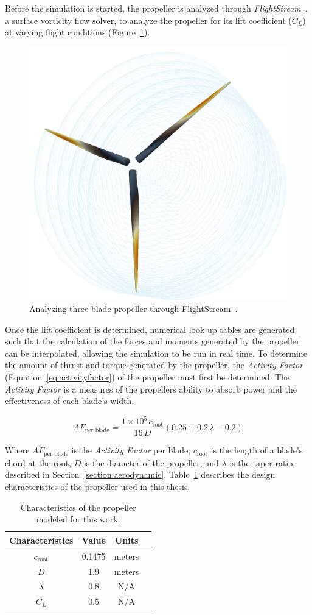 Before the simulation is started, the propeller is analyzed through \textit{FlightStream}~\cite{FlightStream}, a surface vorticity flow solver, to analyze the propeller for its lift coefficient (\(C_L\)) at varying flight conditions (Figure~\ref{fig:flightstreamprop}).

\begin{figure}[!ht]\label{fig:flightstreamprop}
    \centering
    \includegraphics[width=.35\linewidth]{Figures/flightstreamprop.png}
    \caption{Analyzing three-blade propeller through FlightStream~\cite{FlightStream}.}
\end{figure}

Once the lift coefficient is determined, numerical look up tables are generated such that the calculation of the forces and moments generated by the propeller can be interpolated, allowing the simulation to be run in real time. To determine the amount of thrust and torque generated by the propeller, the \textit{Activity Factor} (Equation~\ref{eq:activityfactor}) of the propeller must first be determined. The \textit{Activity Factor} is a measures of the propellers ability to absorb power and the effectiveness of each blade's width.

\begin{equation}\label{eq:activityfactor}
    AF_{\textrm{per blade}} = \frac{1 \times 10^5 \, c_{\textrm{root}}}{16 \, D} \left(0.25 + 0.2 \, \lambda - 0.2 \right)
\end{equation}

Where \(AF_{\textrm{per blade}}\) is the \textit{Activity Factor} per blade, \(c_{\textrm{root}}\) is the length of a blade's chord at the root, \(D\) is the diameter of the propeller, and \( \lambda \) is the taper ratio, described in Section~\ref{section:aerodynamic}. Table~\ref{tbl:propparams} describes the design characteristics of the propeller used in this thesis.

\begin{table}[!ht]\label{tbl:propparams}
    \caption{Characteristics of the propeller modeled for this work.}
    \centering
    \begin{tabular}{cccc}
        \toprule
        Characteristics       & Value  & Units  \\
        \midrule
        \(c_{\textrm{root}}\) & 0.1475 & meters \\
        \(D\)                 & 1.9    & meters \\
        \( \lambda \)         & 0.8    & N/A    \\
        \(C_L\)               & 0.5    & N/A    \\
        \bottomrule
    \end{tabular}
\end{table}

